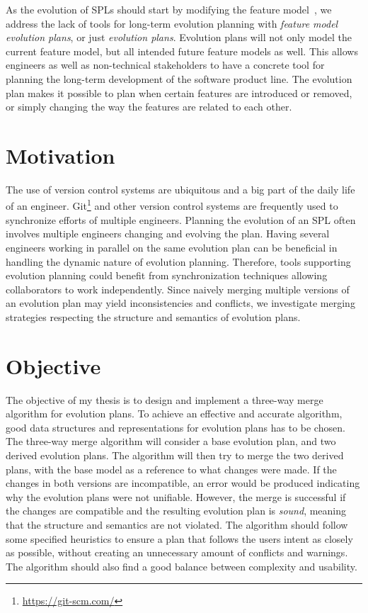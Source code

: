 \documentclass[a4paper,english]{ifimaster}
\begin{document}
As the evolution of SPLs should start by modifying the feature model~\cite{cite:alves_product_line_refactoring}, we address the lack of tools for long-term evolution planning with \textit{feature model evolution plans}, or just \textit{evolution plans}. Evolution plans will not only model the current feature model, but all intended future feature models as well. This allows engineers as well as non-technical stakeholders to have a concrete tool for planning the long-term development of the software product line. The evolution plan makes it possible to plan when certain features are introduced or removed, or simply changing the way the features are related to each other. 

\section{Motivation}%
\label{sec:motivation}

The use of version control systems are ubiquitous and a big part of the daily life of an engineer. Git\footnote{\url{https://git-scm.com/}} and other version control systems are frequently used to synchronize efforts of multiple engineers. Planning the evolution of an SPL often involves multiple engineers changing and evolving the plan. Having several engineers working in parallel on the same evolution plan can be beneficial in handling the dynamic nature of evolution planning. Therefore, tools supporting evolution planning could benefit from synchronization techniques allowing collaborators to work independently. Since naively merging multiple versions of an evolution plan may yield inconsistencies and conflicts, we investigate merging strategies respecting the structure and semantics of evolution plans.

\section{Objective}%
\label{sec:objective}

The objective of my thesis is to design and implement a three-way merge algorithm for evolution plans. To achieve an effective and accurate algorithm, good data structures and representations for evolution plans has to be chosen. The three-way merge algorithm will consider a base evolution plan, and two derived evolution plans. The algorithm will then try to merge the two derived plans, with the base model as a reference to what changes were made. If the changes in both versions are incompatible, an error would be produced indicating why the evolution plans were not unifiable. However, the merge is successful if the changes are compatible and the resulting evolution plan is \textit{sound}, meaning that the structure and semantics are not violated. The algorithm should follow some specified heuristics to ensure a plan that follows the users intent as closely as possible, without creating an unnecessary amount of conflicts and warnings. The algorithm should also find a good balance between complexity and usability.
\end{document}
